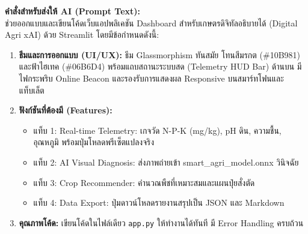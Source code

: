 
\begin{tcolorbox}[colback=black!92,colframe=blue!70!black,arc=2mm,boxrule=0.6pt]
\color{white}\fontsize{9}{13}\selectfont
\noindent\textbf{คำสั่งสำหรับส่งให้ AI (Prompt Text):}\\[4pt]
ช่วยออกแบบและเขียนโค้ดเว็บแอปพลิเคชัน Dashboard สำหรับเกษตรดิจิทัลอธิบายได้ (Digital Agri xAI) ด้วย Streamlit โดยมีข้อกำหนดดังนี้:
\begin{enumerate}[leftmargin=1.8em, itemsep=2pt]
    \item \textbf{ธีมและการออกแบบ (UI/UX):} ธีม Glassmorphism ทันสมัย โทนสีมรกต (\#10B981) และฟ้าไฮเทค (\#06B6D4) พร้อมแถบสถานะระบบสด (Telemetry HUD Bar) ด้านบน มีไฟกระพริบ Online Beacon และรองรับการแสดงผล Responsive บนสมาร์ทโฟนและแท็บเล็ต
    \item \textbf{ฟังก์ชันที่ต้องมี (Features):}
    \begin{itemize}[leftmargin=1.4em, itemsep=1pt]
        \item แท็บ 1: Real-time Telemetry: เกจวัด N-P-K (mg/kg), pH ดิน, ความชื้น, อุณหภูมิ พร้อมปุ่มโหลดพรีเซ็ตแปลงจริง
        \item แท็บ 2: AI Visual Diagnosis: ส่งภาพถ่ายเข้า smart\_agri\_model.onnx วินิจฉัย
        \item แท็บ 3: Crop Recommender: คำนวณพืชที่เหมาะสมและแผนปุ๋ยสั่งตัด
        \item แท็บ 4: Data Export: ปุ่มดาวน์โหลดรายงานสรุปเป็น JSON และ Markdown
    \end{itemize}
    \item \textbf{คุณภาพโค้ด:} เขียนโค้ดในไฟล์เดียว \texttt{app.py} ให้ทำงานได้ทันที มี Error Handling ครบถ้วน
\end{enumerate}
\end{tcolorbox}


